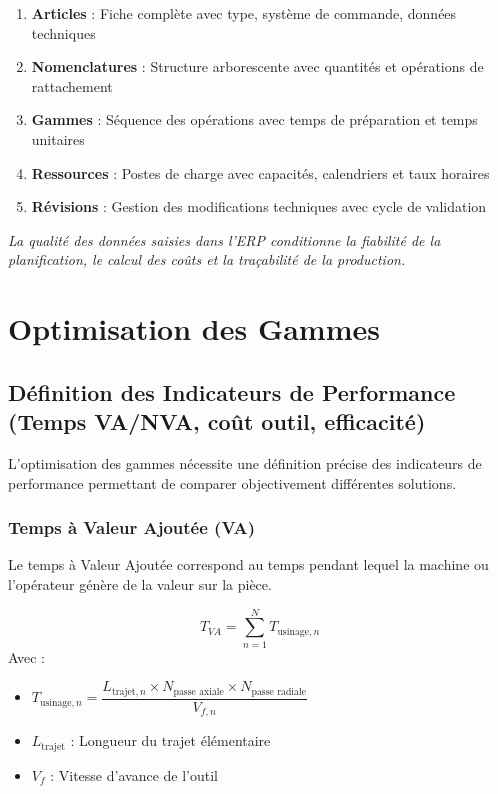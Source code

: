 \documentclass{article}
\begin{document}
\begin{table}[h]
\begin{tcolorbox}[colback=gray!5!white, colframe=gray!75!black, title=Synthèse : Formalisation des Données pour l'ERP]
\begin{enumerate}
    \item \textbf{Articles} : Fiche complète avec type, système de commande, données techniques
    \item \textbf{Nomenclatures} : Structure arborescente avec quantités et opérations de rattachement
    \item \textbf{Gammes} : Séquence des opérations avec temps de préparation et temps unitaires
    \item \textbf{Ressources} : Postes de charge avec capacités, calendriers et taux horaires
    \item \textbf{Révisions} : Gestion des modifications techniques avec cycle de validation
\end{enumerate}
\vspace{0.5em}
\textit{La qualité des données saisies dans l'ERP conditionne la fiabilité de la planification, le calcul des coûts et la traçabilité de la production.}
\end{tcolorbox}

\section{Optimisation des Gammes}

\subsection{Définition des Indicateurs de Performance (Temps VA/NVA, coût outil, efficacité)}

L'optimisation des gammes nécessite une définition précise des indicateurs de performance permettant de comparer objectivement différentes solutions.

\subsubsection{Temps à Valeur Ajoutée (VA)}

Le temps à Valeur Ajoutée correspond au temps pendant lequel la machine ou l'opérateur génère de la valeur sur la pièce.

\begin{tcolorbox}[colback=blueclair, colframe=blue!70!black, title=Calcul du temps VA]
\[
T_{VA} = \sum_{n=1}^{N} T_{\text{usinage},n}
\]
Avec :
\begin{itemize}
    \item $T_{\text{usinage},n} = \dfrac{L_{\text{trajet},n} \times N_{\text{passe axiale}} \times N_{\text{passe radiale}}}{V_{f,n}}$
    \item $L_{\text{trajet}}$ : Longueur du trajet élémentaire
    \item $V_f$ : Vitesse d'avance de l'outil
\end{itemize}
\end{tcolorbox}


\end{table}
\end{document}
